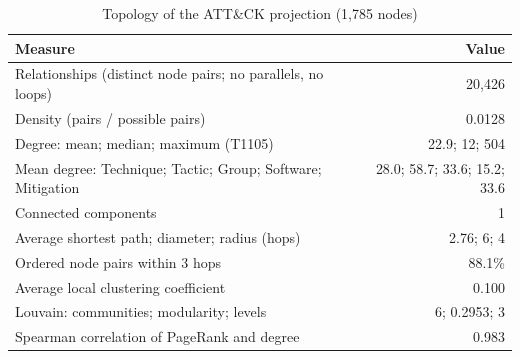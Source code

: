 \documentclass[conference,letterpaper]{IEEEtran}
\begin{document}
\begin{table}[t]\centering\footnotesize
\caption{Topology of the ATT\&CK projection (1,785 nodes)}\label{tab:topology}
\setlength{\tabcolsep}{3pt}
\begin{tabularx}{\linewidth}{@{}>{\raggedright\arraybackslash}X r@{}}
\toprule
Measure & Value\\
\midrule
Relationships (distinct node pairs; no parallels, no loops) & 20,426\\
Density (pairs / possible pairs) & 0.0128\\
Degree: mean; median; maximum (T1105) & 22.9; 12; 504\\
Mean degree: Technique; Tactic; Group; Software; Mitigation & 28.0; 58.7; 33.6; 15.2; 33.6\\
Connected components & 1\\
Average shortest path; diameter; radius (hops) & 2.76; 6; 4\\
Ordered node pairs within 3 hops & 88.1\%\\
Average local clustering coefficient & 0.100\\
Louvain: communities; modularity; levels & 6; 0.2953; 3\\
Spearman correlation of PageRank and degree & 0.983\\
\bottomrule
\end{tabularx}
\end{table}
\end{document}
